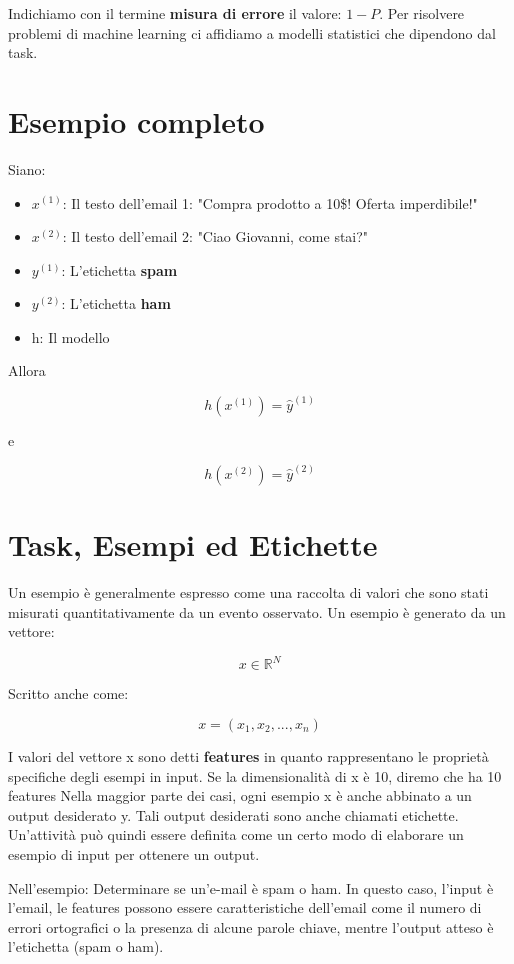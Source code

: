 \noindent
Indichiamo con il termine \textbf{misura di errore} il valore: $1 - P$. Per risolvere problemi di machine learning ci affidiamo a modelli statistici che dipendono dal task.

\section{Esempio completo}

Siano:

\begin{itemize}
\item $x^{(1)}$: Il testo dell'email 1: "Compra prodotto a 10\$! Oferta imperdibile!"
\item $x^{(2)}$: Il testo dell'email 2: "Ciao Giovanni, come stai?"

\item $y^{(1)}$: L'etichetta \textbf{spam}
\item $y^{(2)}$: L'etichetta \textbf{ham}
\item h: Il modello
\end{itemize}

\noindent
Allora

$$ h(x^{(1)}) = \hat{y}^{(1)} $$

\noindent
e

$$ h(x^{(2)}) = \hat{y}^{(2)} $$

\section{Task, Esempi ed Etichette}

Un esempio è generalmente espresso come una raccolta di valori che sono stati misurati quantitativamente da un evento osservato. Un esempio è generato da un vettore:

$$ x \in \mathbb{R}^{N} $$

\noindent
Scritto anche come:

$$ x = (x_1, x_2, ..., x_n)$$

I valori del vettore x sono detti \textbf{features} in quanto rappresentano le proprietà specifiche degli esempi in input. Se la dimensionalità di x è 10, diremo che ha 10 features Nella maggior parte dei casi, ogni esempio x è anche abbinato a un output desiderato y. Tali output desiderati sono anche chiamati etichette. Un'attività può quindi essere definita come un certo modo di elaborare un esempio di input per ottenere un output.

Nell'esempio: Determinare se un'e-mail è spam o ham. In questo caso, l'input è l'email, le features possono essere caratteristiche dell'email come il numero di errori ortografici o la presenza di alcune parole chiave, mentre l'output atteso è l'etichetta (spam o ham).

